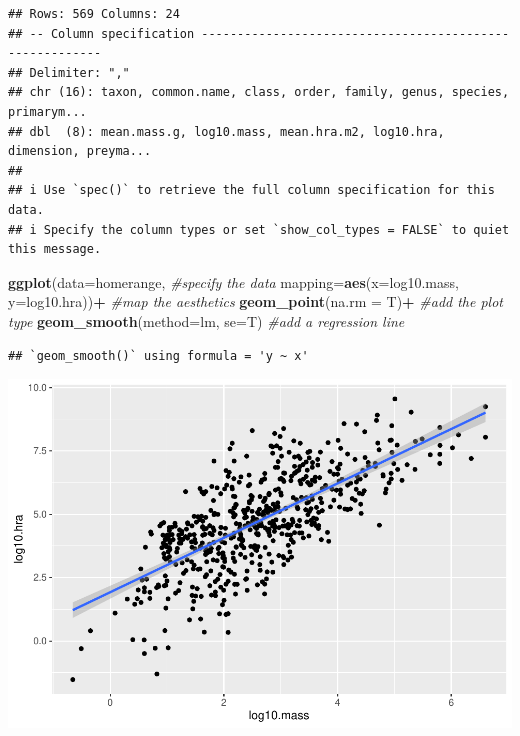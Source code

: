 \documentclass[
]{article}
\newenvironment{Shaded}{\begin{snugshade}}{\end{snugshade}}
\newcommand{\AttributeTok}[1]{\textcolor[rgb]{0.13,0.29,0.53}{#1}}
\newcommand{\CommentTok}[1]{\textcolor[rgb]{0.56,0.35,0.01}{\textit{#1}}}
\newcommand{\FunctionTok}[1]{\textcolor[rgb]{0.13,0.29,0.53}{\textbf{#1}}}
\newcommand{\NormalTok}[1]{#1}
\newcommand{\SpecialCharTok}[1]{\textcolor[rgb]{0.81,0.36,0.00}{\textbf{#1}}}
\begin{document}
\begin{verbatim}
## Rows: 569 Columns: 24
## -- Column specification --------------------------------------------------------
## Delimiter: ","
## chr (16): taxon, common.name, class, order, family, genus, species, primarym...
## dbl  (8): mean.mass.g, log10.mass, mean.hra.m2, log10.hra, dimension, preyma...
## 
## i Use `spec()` to retrieve the full column specification for this data.
## i Specify the column types or set `show_col_types = FALSE` to quiet this message.
\end{verbatim}

\begin{Shaded}
\begin{Highlighting}[]
\FunctionTok{ggplot}\NormalTok{(}\AttributeTok{data=}\NormalTok{homerange, }\CommentTok{\#specify the data}
       \AttributeTok{mapping=}\FunctionTok{aes}\NormalTok{(}\AttributeTok{x=}\NormalTok{log10.mass, }\AttributeTok{y=}\NormalTok{log10.hra))}\SpecialCharTok{+} \CommentTok{\#map the aesthetics}
  \FunctionTok{geom\_point}\NormalTok{(}\AttributeTok{na.rm =}\NormalTok{ T)}\SpecialCharTok{+} \CommentTok{\#add the plot type}
  \FunctionTok{geom\_smooth}\NormalTok{(}\AttributeTok{method=}\NormalTok{lm, }\AttributeTok{se=}\NormalTok{T) }\CommentTok{\#add a regression line}
\end{Highlighting}
\end{Shaded}

\begin{verbatim}
## `geom_smooth()` using formula = 'y ~ x'
\end{verbatim}

\includegraphics{Untitled_files/figure-latex/unnamed-chunk-19-2.pdf}
\end{document}
